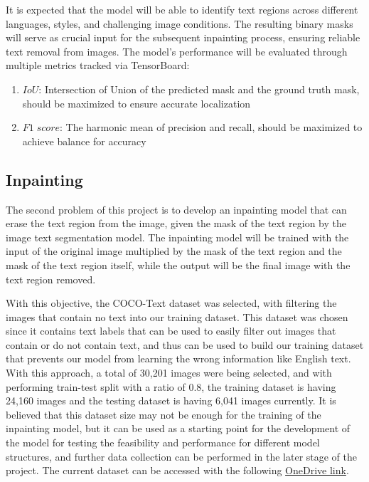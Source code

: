 \documentclass[10pt,twocolumn,letterpaper]{article}
\begin{document}
It is expected that the model will be able to identify text regions across different languages, styles, and challenging image conditions. 
The resulting binary masks will serve as crucial input for the subsequent inpainting process, ensuring reliable text removal from images. 
The model's performance will be evaluated through multiple metrics tracked via TensorBoard:
\begin{enumerate}
    \item $IoU$: Intersection of Union of the predicted mask and the ground truth mask, should be maximized to ensure accurate localization
    \item $F1\;score$: The harmonic mean of precision and recall, should be maximized to achieve balance for accuracy 
\end{enumerate}

\subsection{Inpainting}

The second problem of this project is to develop an inpainting model that can erase the text region from the image, given the mask of the text region by 
the image text segmentation model. The inpainting model will be trained with the input of the original image multiplied by the mask of the text region and 
the mask of the text region itself, while the output will be the final image with the text region removed.

With this objective, the COCO-Text dataset was selected, with filtering the images that contain no text into our training dataset. This dataset was 
chosen since it contains text labels that can be used to easily filter out images that contain or do not contain text, and thus can be used to build our training 
dataset that prevents our model from learning the wrong information like English text. With this approach, a total of 30,201 images were being selected, and with 
performing train-test split with a ratio of 0.8, the training dataset is having 24,160 images and the testing dataset is having 6,041 images currently. It is believed
that this dataset size may not be enough for the training of the inpainting model, but it can be used as a starting point for the development of the model for testing
the feasibility and performance for different model structures, and further data collection can be performed in the later stage of the project. The current dataset can
be accessed with the following 
\href{https://hkustconnect-my.sharepoint.com/:u:/g/personal/tkleungal_connect_ust_hk/EUJ-38d8cptNgW2RK0JzHI4BfIi5mXwbIEFObTG7ji9f8g?e=LqJ1Eu}{OneDrive link}.
\end{document}
